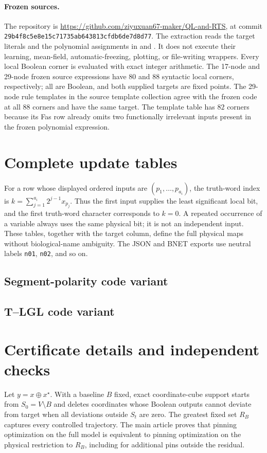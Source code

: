 \paragraph{Frozen sources.}
The repository is \url{https://github.com/ziyuxuan67-maker/QL-and-RTS},
at commit \texttt{29b4f8c5e8e15c71735ab643813cfdb6de7d8d77}.
The extraction reads the target literals and the polynomial assignments
in  and . It does not execute their
learning, mean-field, automatic-freezing, plotting, or file-writing
wrappers. Every local Boolean corner is evaluated with exact integer
arithmetic. The 17-node and 29-node frozen source expressions have
$80$ and $88$ syntactic local corners, respectively; all are Boolean,
and both supplied targets are fixed points. The 29-node rule templates
in the source template collection agree with the frozen code at all
$88$ corners and have the same target. The template table has $82$
corners because its Fas row already omits two functionally irrelevant
inputs present in the frozen polynomial expression.

\section{Complete update tables}
\label{bio:update-tables}
For a row whose displayed ordered inputs are $(p_1,\ldots,p_{a_i})$,
the truth-word index is $k=\sum_{j=1}^{a_i}2^{j-1}x_{p_j}$.
Thus the first input supplies the least significant local bit, and the
first truth-word character corresponds to $k=0$. A repeated occurrence
of a variable always uses the same physical bit; it is not an independent
input. These tables, together with the target column, define the full
physical maps without biological-name ambiguity. The JSON and BNET
exports use neutral labels \texttt{n01}, \texttt{n02}, and so on.
\subsection{Segment-polarity code variant}

\subsection{T--LGL code variant}


\section{Certificate details and independent checks}
\label{bio:certificate-checks}
Let $y=x\oplus x^\star$. With a baseline $B$ fixed, exact coordinate-cube
support starts from $S_0=V\setminus B$ and deletes coordinates whose
Boolean outputs cannot deviate from target when all deviations outside
$S_t$ are zero. The greatest fixed set $R_B$ captures every controlled
trajectory. The main article proves that pinning optimization on the
full model is equivalent to pinning optimization on the physical
restriction to $R_B$, including for additional pins outside the residual.

